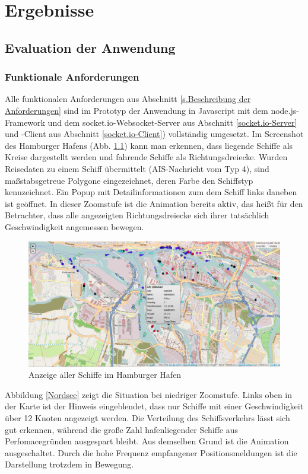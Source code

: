 \chapter{Ergebnisse}

\section{Evaluation der Anwendung}\label{Evaluation der Anwendung}
\subsection{Funktionale Anforderungen}
Alle funktionalen Anforderungen aus Abschnitt \ref{s.Beschreibung der Anforderungen} sind im Prototyp der Anwendung in Javascript mit dem node.js-Framework und dem socket.io-Websocket-Server aus Abschnitt \ref{socket.io-Server} und -Client aus Abschnitt \ref{socket.io-Client}) vollständig umgesetzt. Im Screenshot des Hamburger Hafens (Abb. \ref{Hafen Hamburg}) kann man erkennen, dass liegende Schiffe als Kreise dargestellt werden und fahrende Schiffe als Richtungsdreiecke. Wurden Reisedaten zu einem Schiff übermittelt (AIS-Nachricht vom Typ 4), sind maßstabsgetreue Polygone eingezeichnet, deren Farbe den Schiffstyp kennzeichnet.
Ein Popup mit Detailinformationen zum dem Schiff links daneben ist geöffnet. In dieser Zoomstufe ist die Animation bereits aktiv, das heißt für den Betrachter, dass alle angezeigten Richtungsdreiecke sich ihrer tatsächlich Geschwindigkeit angemessen bewegen.

\begin {figure}[H]
\begin{center}
  \includegraphics[width=6in]{images/Hamburg.png}
\end{center}
\caption{Anzeige aller Schiffe im Hamburger Hafen}
\label{Hafen Hamburg}
\end {figure}
Abbildung \ref{Nordsee} zeigt die Situation bei niedriger Zoomstufe. Links oben in der Karte ist der Hinweis eingeblendet, dass nur Schiffe mit einer Geschwindigkeit über 12 Knoten angezeigt werden. Die Verteilung des Schiffsverkehrs lässt sich gut erkennen, während die große Zahl hafenliegender Schiffe aus Perfomacegründen ausgespart bleibt. Aus demselben Grund ist die Animation ausgeschaltet. Durch die hohe Frequenz empfangener Positionsmeldungen ist die Darstellung trotzdem in Bewegung.


